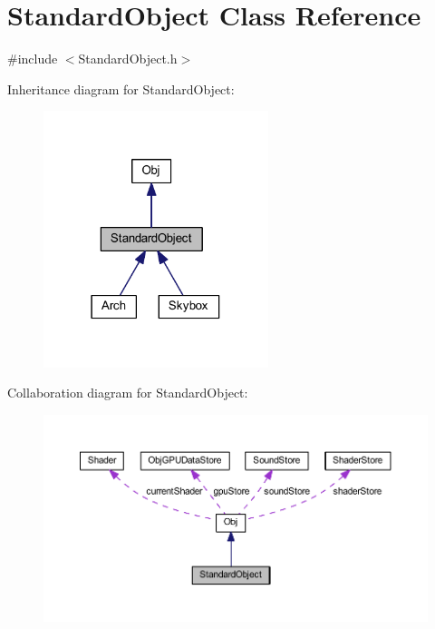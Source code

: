 \hypertarget{class_standard_object}{}\section{Standard\+Object Class Reference}
\label{class_standard_object}


{\ttfamily \#include $<$Standard\+Object.\+h$>$}



Inheritance diagram for Standard\+Object\+:
\nopagebreak
\begin{figure}[H]
\begin{center}
\leavevmode
\includegraphics[width=186pt]{class_standard_object__inherit__graph}
\end{center}
\end{figure}


Collaboration diagram for Standard\+Object\+:
\nopagebreak
\begin{figure}[H]
\begin{center}
\leavevmode
\includegraphics[width=350pt]{class_standard_object__coll__graph}
\end{center}
\end{figure}
